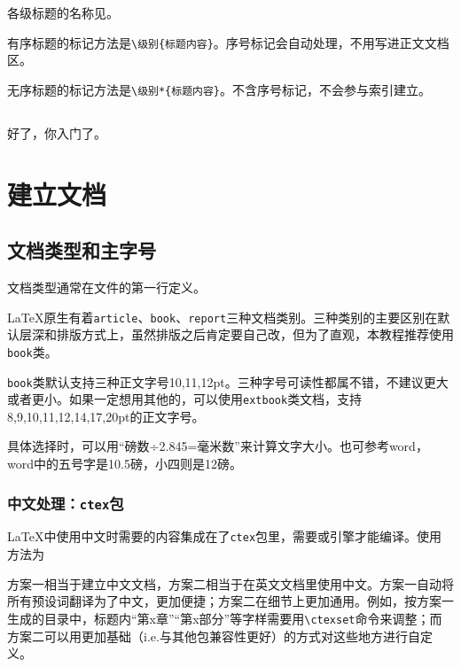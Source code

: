 \documentclass[10pt,openany]{book}
\begin{document}
\begin{sloppypar}
    各级标题的名称见\emph{}。

    有序标题的标记方法是\texttt{\textbackslash{}级别\{标题内容\}}。序号标记会自动处理，不用写进正文文档区。

    无序标题的标记方法是\texttt{\textbackslash{}级别*\{标题内容\}}。不含序号标记，不会参与索引建立。

    \section*{}

    好了，你入门了。

    \chapter{建立文档}

    \section{文档类型和主字号}

    文档类型通常在文件的第一行定义。

    

    {\LaTeX}原生有着\texttt{article}、\texttt{book}、\texttt{report}三种文档类别。三种类别的主要区别在默认层深和排版方式上，虽然排版之后肯定要自己改，但为了直观，本教程推荐使用\texttt{book}类。

    \texttt{book}类默认支持三种正文字号10,11,12pt。三种字号可读性都属不错，不建议更大或者更小。如果一定想用其他的，可以使用\texttt{extbook}类文档，支持8,9,10,11,12,14,17,20pt的正文字号。

    具体选择时，可以用“磅数÷2.845=毫米数”来计算文字大小。也可参考word，word中的五号字是10.5磅，小四则是12磅。

    \subsection{中文处理：\texttt{ctex}包}

    {\LaTeX}中使用中文时需要的内容集成在了\texttt{ctex}包里，需要{\XeLaTeX}或{\LuaLaTeX}引擎才能编译。使用方法为

    

    方案一相当于建立中文文档，方案二相当于在英文文档里使用中文。方案一自动将所有预设词翻译为了中文，更加便捷；方案二在细节上更加通用。例如，按方案一生成的目录中，标题内“第x章”“第x部分”等字样需要用\texttt{\textbackslash{}ctexset}命令来调整；而方案二可以用更加基础（i.e.与其他包兼容性更好）的方式对这些地方进行自定义。


\end{sloppypar}
\end{document}

